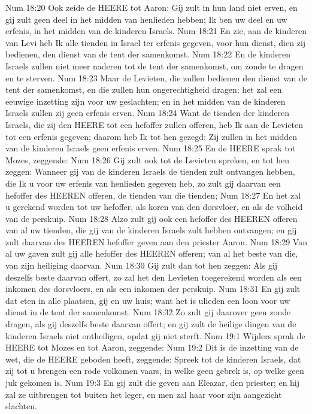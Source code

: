 Num 18:20  Ook zeide de HEERE tot Aaron: Gij zult in hun land niet erven, en gij zult geen deel in het midden van henlieden hebben; Ik ben uw deel en uw erfenis, in het midden van de kinderen Israels.
Num 18:21  En zie, aan de kinderen van Levi heb Ik alle tienden in Israel ter erfenis gegeven, voor hun dienst, dien zij bedienen, den dienst van de tent der samenkomst.
Num 18:22  En de kinderen Israels zullen niet meer naderen tot de tent der samenkomst, om zonde te dragen en te sterven.
Num 18:23  Maar de Levieten, die zullen bedienen den dienst van de tent der samenkomst, en die zullen hun ongerechtigheid dragen; het zal een eeuwige inzetting zijn voor uw geslachten; en in het midden van de kinderen Israels zullen zij geen erfenis erven.
Num 18:24  Want de tienden der kinderen Israels, die zij den HEERE tot een hefoffer zullen offeren, heb Ik aan de Levieten tot een erfenis gegeven; daarom heb Ik tot hen gezegd: Zij zullen in het midden van de kinderen Israels geen erfenis erven.
Num 18:25  En de HEERE sprak tot Mozes, zeggende:
Num 18:26  Gij zult ook tot de Levieten spreken, en tot hen zeggen: Wanneer gij van de kinderen Israels de tienden zult ontvangen hebben, die Ik u voor uw erfenis van henlieden gegeven heb, zo zult gij daarvan een hefoffer des HEEREN offeren, de tienden van die tienden;
Num 18:27  En het zal u gerekend worden tot uw hefoffer, als koren van den dorsvloer, en als de volheid van de perskuip.
Num 18:28  Alzo zult gij ook een hefoffer des HEEREN offeren van al uw tienden, die gij van de kinderen Israels zult hebben ontvangen; en gij zult daarvan des HEEREN hefoffer geven aan den priester Aaron.
Num 18:29  Van al uw gaven zult gij alle hefoffer des HEEREN offeren; van al het beste van die, van zijn heiliging daarvan.
Num 18:30  Gij zult dan tot hen zeggen: Als gij deszelfs beste daarvan offert, zo zal het den Levieten toegerekend worden als een inkomen des dorsvloers, en als een inkomen der perskuip.
Num 18:31  En gij zult dat eten in alle plaatsen, gij en uw huis; want het is ulieden een loon voor uw dienst in de tent der samenkomst.
Num 18:32  Zo zult gij daarover geen zonde dragen, als gij deszelfs beste daarvan offert; en gij zult de heilige dingen van de kinderen Israels niet ontheiligen, opdat gij niet sterft.
Num 19:1  Wijders sprak de HEERE tot Mozes en tot Aaron, zeggende:
Num 19:2  Dit is de inzetting van de wet, die de HEERE geboden heeft, zeggende: Spreek tot de kinderen Israels, dat zij tot u brengen een rode volkomen vaars, in welke geen gebrek is, op welke geen juk gekomen is.
Num 19:3  En gij zult die geven aan Eleazar, den priester; en hij zal ze uitbrengen tot buiten het leger, en men zal haar voor zijn aangezicht slachten.
